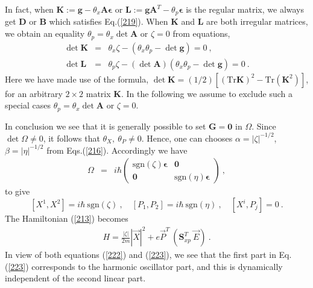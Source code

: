 \documentclass[a4paper,seceq]{ptptex}
\newcommand{\bfg}{ \boldsymbol{g} }
\newcommand{\bfA}{ \boldsymbol{A} }
\newcommand{\bfB}{ \boldsymbol{B} }
\newcommand{\bfD}{ \boldsymbol{D} }
\newcommand{\bfG}{ \boldsymbol{G} }
\newcommand{\bfK}{ \boldsymbol{K} }
\newcommand{\bfL}{ \boldsymbol{L} }
\newcommand{\bfS}{ \boldsymbol{S} }
\newcommand{\bfeps}{\boldsymbol{\epsilon}}
\newcommand{\vecE}{ {\vec E} }
\newcommand{\vecP}{ {\vec P} }
\newcommand{\vecX}{ {\vec X} }
\newcommand{\sgn}{{\mbox{sgn}}}
\newcommand{\Tr}{\mbox{Tr}}
\newcommand{\DEF}{:=}
\begin{document}
In fact, when $\bfK \DEF  \bfg - \theta_x \bfA \bfeps$ or
$\bfL \DEF  \bfg \bfA^T - \theta_p \bfeps$ is the regular matrix,
we always get $\bfD$ or $\bfB$  which satisfies Eq.(\ref{219}).
When $\bfK$ and $\bfL$ are both irregular matrices,
we obtain an equality $\theta_p = \theta_x \det\bfA$ or $\zeta=0$
from equations,
\begin{eqnarray}
 \det \bfK
  &=& \theta_x \zeta - \left( \theta_x \theta_p - \det \bfg \right)=0~,
\nonumber \\
 \det \bfL &=& \theta_p \zeta - \left( \det \bfA \right)
            \left( \theta_x \theta_p - \det \bfg \right)=0~.
\label{220}
\end{eqnarray}
Here we have made use of the formula, $\det\bfK = (1/2)\left[
\left( \Tr \bfK \right)^2 - \Tr\left( \bfK^2 \right)\right]$,
for an arbitrary $2\times 2$ matrix $\bfK$.
In the following we assume to exclude such a special cases
$\theta_p = \theta_x \det\bfA$ or $\zeta=0$.

In conclusion we see that it is generally possible to set
$\bfG = \boldsymbol{0}$ in $\Omega$.
Since $\det\Omega \ne 0$, it follows that $\theta_X,~\theta_P \ne 0$.
Hence, one can chooses $\alpha=|\zeta|^{-1/2}$,
$\beta = |\eta|^{-1/2}$ from Eqs.(\ref{216}).
Accordingly we have
\begin{eqnarray}
 \Omega &=& i \hbar
      \begin{pmatrix}
         \sgn(\zeta) \bfeps & \boldsymbol{0} \\
                    \boldsymbol{0} & \sgn(\eta) \bfeps \end{pmatrix}~,
\label{221}
\end{eqnarray}
to give
\begin{equation}
\label{222}
 \left[X^1, X^2 \right] = i\hbar~\sgn(\zeta)~, \quad
 \left[P_1, P_2 \right] = i\hbar~\sgn(\eta)~, \quad
 \left[X^i, P_j \right] = 0~.
\end{equation}
The Hamiltonian (\ref{213}) becomes
\begin{eqnarray}
  H = \frac{|\zeta|}{2m} \left\vert \vecX \right\vert^2
    + e \vecP^T~\left(\bfS_{xp}^T~\vecE \right)~.
\label{223}
\end{eqnarray}
In view of both equations (\ref{222}) and (\ref{223}),
we see that the first part in Eq.(\ref{223}) corresponds to
the harmonic oscillator part, and this is dynamically independent of
the second linear part.
\end{document}
